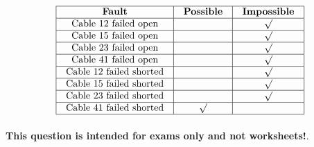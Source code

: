 






$$\vbox{\offinterlineskip
\halign{\strut
\vrule \quad\hfil # \ \hfil & 
\vrule \quad\hfil # \ \hfil & 
\vrule \quad\hfil # \ \hfil \vrule \cr
\noalign{\hrule}
%
{\bf Fault} & {\bf Possible} & {\bf Impossible} \cr
%
\noalign{\hrule}
%
Cable 12 failed open &  & $\surd$ \cr
%
\noalign{\hrule}
%
Cable 15 failed open &  & $\surd$ \cr
%
\noalign{\hrule}
%
Cable 23 failed open &  & $\surd$ \cr
%
\noalign{\hrule}
%
Cable 41 failed open &  & $\surd$ \cr
%
\noalign{\hrule}
%
Cable 12 failed shorted &  & $\surd$ \cr
%
\noalign{\hrule}
%
Cable 15 failed shorted &  & $\surd$ \cr
%
\noalign{\hrule}
%
Cable 23 failed shorted &  & $\surd$ \cr
%
\noalign{\hrule}
%
Cable 41 failed shorted & $\surd$ &  \cr
%
\noalign{\hrule}
} %
}$$ %







{\bf This question is intended for exams only and not worksheets!}.



